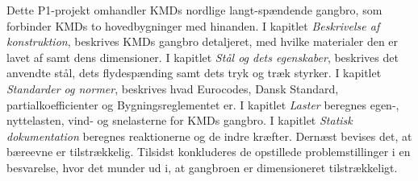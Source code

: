 Dette P1-projekt omhandler KMDs nordlige langt-spændende gangbro, som forbinder KMDs to hovedbygninger med hinanden. I kapitlet \textit{Beskrivelse af konstruktion}, beskrives KMDs gangbro detaljeret, med hvilke materialer den er lavet af samt dens dimensioner. I kapitlet \textit{Stål og dets egenskaber}, beskrives det anvendte stål, dets flydespænding samt dets tryk og træk styrker. I kapitlet \textit{Standarder og normer}, beskrives hvad Eurocodes, Dansk Standard, partialkoefficienter og Bygningsreglementet er. I kapitlet \textit{Laster} beregnes egen-, nyttelasten, vind- og snelasterne for KMDs gangbro. I kapitlet \textit{Statisk dokumentation} beregnes reaktionerne og de indre kræfter. Dernæst bevises det, at bæreevne er tilstrækkelig. Tilsidst konkluderes de opstillede problemstillinger i en besvarelse, hvor det munder ud i, at gangbroen er dimensioneret tilstrækkeligt.


